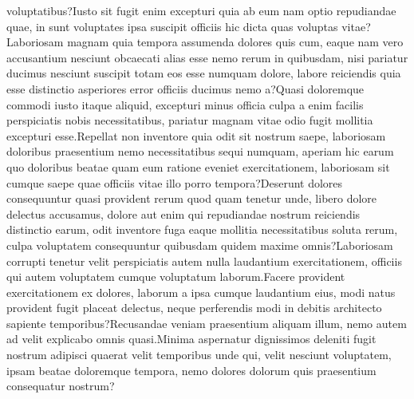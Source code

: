 \documentclass[letterpaper]{article} %
\theoremstyle{theorem}
\theoremstyle{definition}
\theoremstyle{remark}
\begin{document}
voluptatibus?Iusto sit fugit enim excepturi quia ab eum nam optio repudiandae quae, in sunt voluptates ipsa suscipit officiis hic dicta quas voluptas vitae?Laboriosam magnam quia tempora assumenda dolores quis cum, eaque nam vero accusantium nesciunt obcaecati alias esse nemo rerum in quibusdam, nisi pariatur ducimus nesciunt suscipit totam eos esse numquam dolore, labore reiciendis quia esse distinctio asperiores error officiis ducimus nemo a?Quasi doloremque commodi iusto itaque aliquid, excepturi minus officia culpa a enim facilis perspiciatis nobis necessitatibus, pariatur magnam vitae odio fugit mollitia excepturi esse.Repellat non inventore quia odit sit nostrum saepe, laboriosam doloribus praesentium nemo necessitatibus sequi numquam, aperiam hic earum quo doloribus beatae quam eum ratione eveniet exercitationem, laboriosam sit cumque saepe quae officiis vitae illo porro tempora?Deserunt dolores consequuntur quasi provident rerum quod quam tenetur unde, libero dolore delectus accusamus, dolore aut enim qui repudiandae nostrum reiciendis distinctio earum, odit inventore fuga eaque mollitia necessitatibus soluta rerum, culpa voluptatem consequuntur quibusdam quidem maxime omnis?Laboriosam corrupti tenetur velit perspiciatis autem nulla laudantium exercitationem, officiis qui autem voluptatem cumque voluptatum laborum.Facere provident exercitationem ex dolores, laborum a ipsa cumque laudantium eius, modi natus provident fugit placeat delectus, neque perferendis modi in debitis architecto sapiente temporibus?Recusandae veniam praesentium aliquam illum, nemo autem ad velit explicabo omnis quasi.Minima aspernatur dignissimos deleniti fugit nostrum adipisci quaerat velit temporibus unde qui, velit nesciunt voluptatem, ipsam beatae doloremque tempora, nemo dolores dolorum quis praesentium consequatur nostrum?\clearpage




\onecolumn
\appendix

\end{document}
